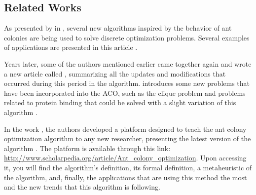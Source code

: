 \subsection{Related Works}

As presented by \citeauthor{ACO_New_Algorithm} in , several
new algorithms inspired by the behavior of ant colonies are being used
to solve discrete optimization problems. Several
examples of applications are presented in this article \cite{ACO_New_Algorithm}.

Years later, some of the authors mentioned earlier came together again and
wrote a new article called , summarizing all the updates
and modifications that occurred during this period in the algorithm. \citeauthor{UpdatesInACO} introduces
some new problems that have been incorporated into the ACO, such as the clique problem and problems
related to protein binding that could be solved with a slight variation of this algorithm
\cite{UpdatesInACO}.

In the work , the authors \citeauthor{ACO_New_Algorithm_20anos}
developed a platform designed to teach the ant colony optimization algorithm
to any new researcher, presenting the latest version of the algorithm \cite{ACO_New_Algorithm_20anos}.
The platform is available through this link: \url{http://www.scholarpedia.org/article/Ant_colony_optimization}.
Upon accessing it, you will find the algorithm's definition, its formal definition, a metaheuristic
of the algorithm, and, finally, the applications that are using this method the most and the new trends
that this algorithm is following.
